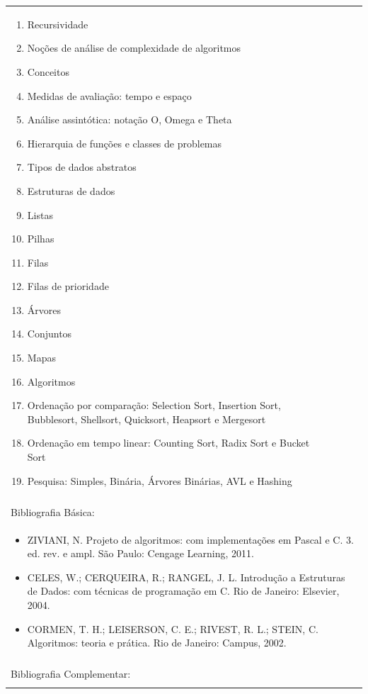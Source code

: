 \documentclass[11pt]{article}
\begin{document}
\begin{center}
\begin{longtable}{|p{4cm}|p{4cm}|p{4cm}|p{4cm}|}
{\begin{enumerate}
\item Recursividade
\item Noções de análise de complexidade de algoritmos
\item Conceitos
\item Medidas de avaliação: tempo e espaço
\item Análise assintótica: notação O, Omega e Theta
\item Hierarquia de funções e classes de problemas
\item Tipos de dados abstratos
\item Estruturas de dados
\item Listas
\item Pilhas
\item Filas
\item Filas de prioridade
\item Árvores
\item Conjuntos
\item Mapas
\item Algoritmos
\item Ordenação por comparação: Selection Sort, Insertion Sort, Bubblesort, Shellsort, Quicksort, Heapsort e Mergesort
\item Ordenação em tempo linear: Counting Sort, Radix Sort e Bucket Sort
\item Pesquisa: Simples, Binária, Árvores Binárias, AVL e Hashing\end{enumerate}}\\
\multicolumn{4}{|p{16cm}|}{}\\
\hline
\multicolumn{4}{|p{16cm}|}{Bibliografia Básica:}\\
\multicolumn{4}{|p{16cm}|}{%
\begin{itemize}\item ZIVIANI, N. Projeto de algoritmos: com implementações em Pascal e C. 3. ed. rev. e ampl. São Paulo: Cengage Learning, 2011.
\item CELES, W.; CERQUEIRA, R.; RANGEL, J. L. Introdução a Estruturas de Dados: com técnicas de programação em C. Rio de Janeiro: Elsevier, 2004.
\item CORMEN, T. H.; LEISERSON, C. E.; RIVEST, R. L.; STEIN, C. Algoritmos: teoria e prática. Rio de Janeiro: Campus, 2002.\end{itemize}}\\
\multicolumn{4}{|p{16cm}|}{}\\
\hline
\multicolumn{4}{|p{16cm}|}{Bibliografia Complementar:}\\
\multicolumn{4}{|p{16cm}|}{%
}
\end{longtable}
\end{center}
\end{document}
